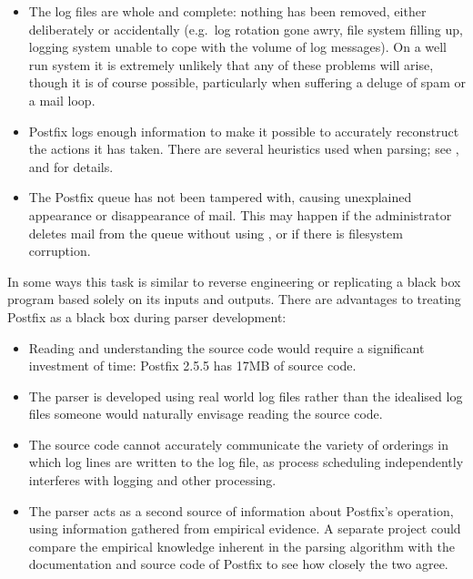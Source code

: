 \begin{itemize}

    \item The log files are whole and complete: nothing has been removed,
        either deliberately or accidentally (e.g.\ log rotation gone awry,
        file system filling up, logging system unable to cope with the
        volume of log messages).  On a well run system it is extremely
        unlikely that any of these problems will arise, though it is of
        course possible, particularly when suffering a deluge of spam or a
        mail loop.

    \item Postfix logs enough information to make it possible to accurately
        reconstruct the actions it has taken.  There are several heuristics
        used when parsing; see
        ,
         and  for details.

    \item The Postfix queue has not been tampered with, causing unexplained
        appearance or disappearance of mail.  This may happen if the
        administrator deletes mail from the queue without using
        , or if there is filesystem corruption.

\end{itemize}

In some ways this task is similar to reverse engineering or replicating a
black box program based solely on its inputs and outputs.  There are advantages to
treating Postfix as a black box during parser development:

\begin{itemize}

    \item Reading and understanding the source code would require a
        significant investment of time: Postfix 2.5.5 has 17MB of source
        code.  

    \item The parser is developed using real world log files rather than
        the idealised log files someone would naturally envisage reading
        the source code.

    \item The source code cannot accurately communicate the variety of
        orderings in which log lines are written to the log file, as
        process scheduling independently interferes with logging and other
        processing.

    \item The parser acts as a second source of information about Postfix's
        operation, using information gathered from empirical evidence.  A
        separate project could compare the empirical knowledge inherent in
        the parsing algorithm with the documentation and source code of
        Postfix to see how closely the two agree.

\end{itemize}



